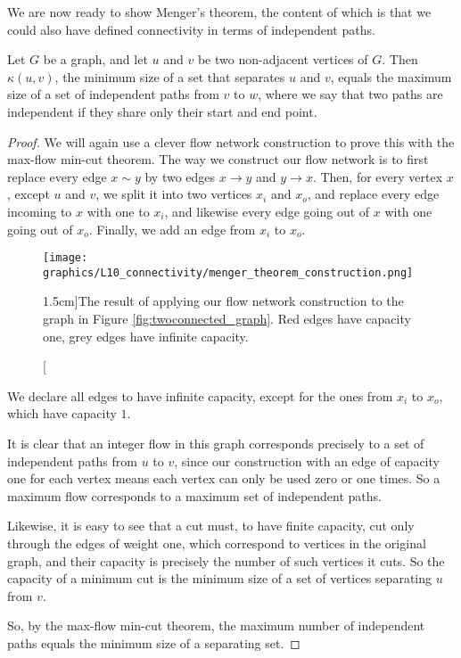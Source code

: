 \documentclass[nobib]{tufte-handout}
\begin{document}
We are now ready to show Menger's theorem, the content of which is that we could also have defined connectivity in terms of independent paths.

\begin{theorem}[Menger]\label{thm:menger_local}
  Let $G$ be a graph, and let $u$ and $v$ be two non-adjacent vertices of $G$. Then $\kappa(u,v)$, the minimum size of a set that separates $u$ and $v$, equals the maximum size of a set of independent paths from $v$ to $w$, where we say that two paths are independent if they share only their start and end point.

  \begin{proof}
    We will again use a clever flow network construction to prove this with the max-flow min-cut theorem. The way we construct our flow network is to first replace every edge $x\sim y$ by two edges $x\to y$ and $y\to x$. Then, for every vertex $x$, except $u$ and $v$, we split it into two vertices $x_i$ and $x_o$, and replace every edge incoming to $x$ with one to $x_i$, and likewise every edge going out of $x$ with one going out of $x_o$. Finally, we add an edge from $x_i$ to $x_o$.

    \begin{figure}
      \centering
      \texttt{[image: graphics/L10\_connectivity/menger\_theorem\_construction.png]}
      \caption[][1.5cm]{The result of applying our flow network construction to the graph in Figure \ref{fig:twoconnected_graph}. Red edges have capacity one, grey edges have infinite capacity.}
      \label{fig:menger_thm_construction}
    \end{figure}

    We declare all edges to have infinite capacity, except for the ones from $x_i$ to $x_o$, which have capacity $1$.

    It is clear that an integer flow in this graph corresponds precisely to a set of independent paths from $u$ to $v$, since our construction with an edge of capacity one for each vertex means each vertex can only be used zero or one times. So a maximum flow corresponds to a maximum set of independent paths.

    Likewise, it is easy to see that a cut must, to have finite capacity, cut only through the edges of weight one, which correspond to vertices in the original graph, and their capacity is precisely the number of such vertices it cuts. So the capacity of a minimum cut is the minimum size of a set of vertices separating $u$ from $v$.

    So, by the max-flow min-cut theorem, the maximum number of independent paths equals the minimum size of a separating set.
  \end{proof}
\end{theorem}
\end{document}
